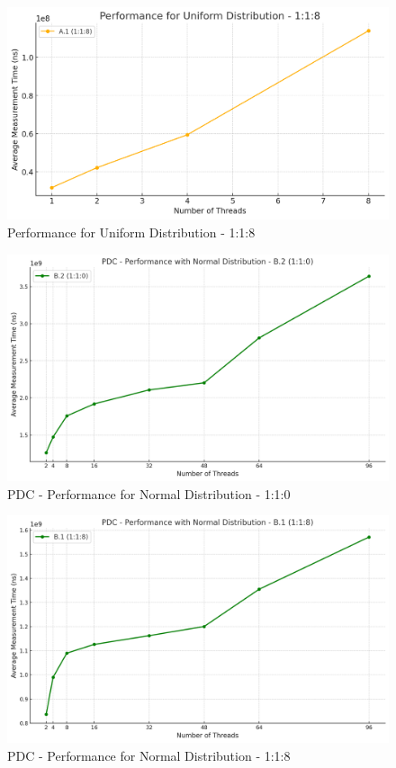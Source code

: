 \documentclass{article}
\begin{document}
\begin{figure}[H]
    \centering
    \includegraphics[width=\textwidth]{LaTex/images/Lab 3 1.2.2.png}
    \caption{Performance for Uniform Distribution - 1:1:8}
    \label{fig:enter-label}
\end{figure}

\begin{figure}[H]
    \centering
    \includegraphics[width=\textwidth]{LaTex/images/Lab 3 1.2.3.png}
    \caption{PDC - Performance for Normal Distribution - 1:1:0}
    \label{fig:enter-label}
\end{figure}

\begin{figure}[H]
    \centering
    \includegraphics[width=\textwidth]{LaTex/images/Lab 3 1.2.4.png}
    \caption{PDC - Performance for Normal Distribution - 1:1:8}
    \label{fig:enter-label}
\end{figure}
\end{document}
